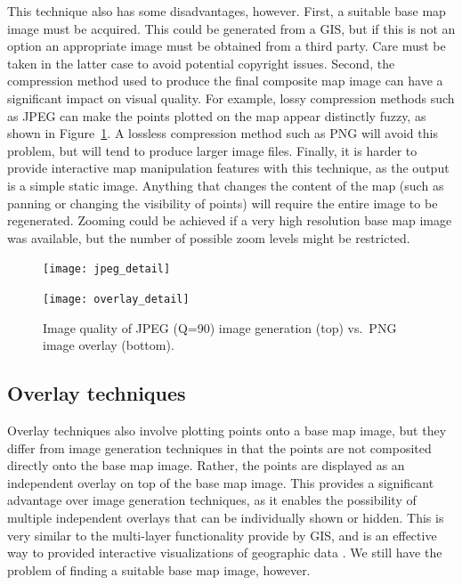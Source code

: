 \documentclass[acmtocl,acmnow]{acmtrans2m}
\begin{document}
This technique also has some disadvantages, however. First, a suitable
base map image must be acquired. This could be generated from a GIS, but
if this is not an option an appropriate image must be obtained from a
third party. Care must be taken in the latter case to avoid potential
copyright issues. Second, the compression method used to produce the
final composite map image can have a significant impact on visual
quality. For example, lossy compression methods such as JPEG can make
the points plotted on the map appear distinctly fuzzy, as shown in
Figure~\ref{fig-image-quality}. A lossless compression method such as
PNG will avoid this problem, but will tend to produce larger image
files. Finally, it is harder to provide interactive map manipulation
features with this technique, as the output is a simple static image.
Anything that changes the content of the map (such as panning or
changing the visibility of points) will require the entire image to be
regenerated. Zooming could be achieved if a very high resolution base
map image was available, but the number of possible zoom levels might be
restricted.


\begin{figure}
	\centering
	\texttt{[image: jpeg\_detail]}\medskip
	
	\texttt{[image: overlay\_detail]}
	\caption{Image quality of JPEG (Q=90) image generation (top) vs.\
	PNG image overlay (bottom).}
	\label{fig-image-quality}
\end{figure}


\subsection{Overlay techniques}
\label{sec-overlay}


Overlay techniques also involve plotting points onto a base map image,
but they differ from image generation techniques in that the points are
not composited directly onto the base map image. Rather, the points are
displayed as an independent overlay on top of the base map image. This
provides a significant advantage over image generation techniques, as it
enables the possibility of multiple independent overlays that can be
individually shown or hidden. This is very similar to the multi-layer
functionality provide by GIS, and is an effective way to provided
interactive visualizations of geographic data
\cite{Wood-J-1996-vis,MacE-AM-1998-GIS}. We still have the problem of
finding a suitable base map image, however.
\end{document}
